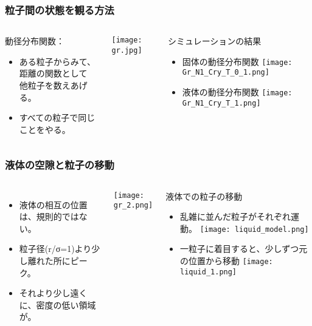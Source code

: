 \documentclass[12pt, dvipdfmx]{beamer}
\begin{document}
\begin{frame}
	\frametitle{粒子間の状態を観る方法}
	\begin{columns}[T, onlytextwidth]
			\begin{exampleblock}{動径分布関数：}
				\begin{itemize}
					\item ある粒子からみて、\\距離の関数として\\他粒子を数えあげる。
					\item すべての粒子で同じことをやる。
				\end{itemize}
			\end{exampleblock}
			\begin{center}
				\texttt{[image: gr.jpg]}
			\end{center}
			\begin{block}{シミュレーションの結果}
				\begin{itemize}
					\item 固体の動径分布関数
					\texttt{[image: Gr\_N1\_Cry\_T\_0\_1.png]}
					\item 液体の動径分布関数
					\texttt{[image: Gr\_N1\_Cry\_T\_1.png]}
				\end{itemize}
			\end{block}
	\end{columns}
\end{frame}

\begin{frame}
	\frametitle{液体の空隙と粒子の移動}
		\begin{columns}[T, onlytextwidth]
				\begin{itemize}
					\item 液体の相互の位置は、規則的ではない。
					\item 粒子径(r/σ=1)より少し離れた所にピーク。
					\item それより少し遠くに、密度の低い領域が。
				\end{itemize}
					\begin{center}
						\texttt{[image: gr\_2.png]}
					\end{center}
				\begin{exampleblock}{液体での粒子の移動}
					\begin{itemize}
						\item 乱雑に並んだ粒子がそれぞれ運動。
						\texttt{[image: liquid\_model.png]}
						\item 一粒子に着目すると、少しずつ元の位置から移動
						\texttt{[image: liquid\_1.png]}
					\end{itemize}
				\end{exampleblock}
		\end{columns}
\end{frame}
\end{document}
